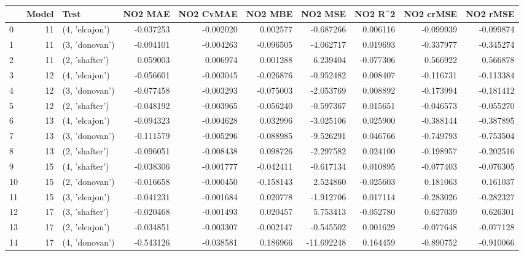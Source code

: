 \begin{tabular}{lrlrrrrrrr}
\toprule
{} &  Model &            Test &   NO2 MAE &  NO2 CvMAE &   NO2 MBE &    NO2 MSE &   NO2 R\textasciicircum2 &  NO2 crMSE &  NO2 rMSE \\
\midrule
0  &     11 &  (4, 'elcajon') & -0.037253 &  -0.002020 &  0.002577 &  -0.687266 &  0.006116 &  -0.099939 & -0.099874 \\
1  &     11 &  (3, 'donovan') & -0.094101 &  -0.004263 & -0.096505 &  -4.062717 &  0.019693 &  -0.337977 & -0.345274 \\
2  &     11 &  (2, 'shafter') &  0.059003 &   0.006974 &  0.001288 &   6.239404 & -0.077306 &   0.566922 &  0.566878 \\
3  &     12 &  (4, 'elcajon') & -0.056601 &  -0.003045 & -0.026876 &  -0.952482 &  0.008407 &  -0.116731 & -0.113384 \\
4  &     12 &  (3, 'donovan') & -0.077458 &  -0.003293 & -0.075003 &  -2.053769 &  0.008892 &  -0.173994 & -0.181412 \\
5  &     12 &  (2, 'shafter') & -0.048192 &  -0.003965 & -0.056240 &  -0.597367 &  0.015651 &  -0.046573 & -0.055270 \\
6  &     13 &  (4, 'elcajon') & -0.094323 &  -0.004628 &  0.032996 &  -3.025106 &  0.025900 &  -0.388144 & -0.387895 \\
7  &     13 &  (3, 'donovan') & -0.111579 &  -0.005296 & -0.088985 &  -9.526291 &  0.046766 &  -0.749793 & -0.753504 \\
8  &     13 &  (2, 'shafter') & -0.096051 &  -0.008438 &  0.098726 &  -2.297582 &  0.024100 &  -0.198957 & -0.202516 \\
9  &     15 &  (4, 'shafter') & -0.038306 &  -0.001777 & -0.042411 &  -0.617134 &  0.010895 &  -0.077403 & -0.076305 \\
10 &     15 &  (2, 'donovan') & -0.016658 &  -0.000450 & -0.158143 &   2.524860 & -0.025603 &   0.181063 &  0.161037 \\
11 &     15 &  (3, 'elcajon') & -0.041231 &  -0.001684 &  0.020778 &  -1.912706 &  0.017114 &  -0.283026 & -0.282327 \\
12 &     17 &  (3, 'shafter') & -0.020468 &  -0.001493 &  0.020457 &   5.753413 & -0.052780 &   0.627039 &  0.626301 \\
13 &     17 &  (2, 'elcajon') & -0.034851 &  -0.003307 & -0.002147 &  -0.545502 &  0.001629 &  -0.077648 & -0.077128 \\
14 &     17 &  (4, 'donovan') & -0.543126 &  -0.038581 &  0.186966 & -11.692248 &  0.164459 &  -0.890752 & -0.910066 \\

\end{tabular}
